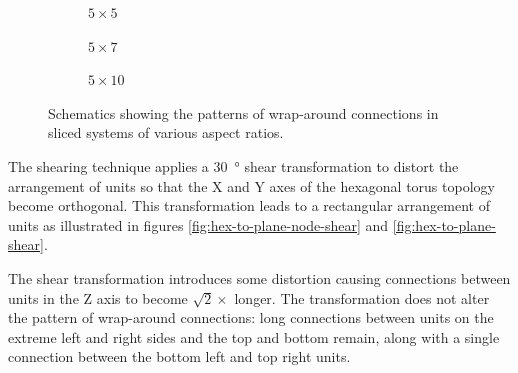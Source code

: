 \begin{figure}
				\caption[Rectangularisation of wrapped triple partitioned toruses.]%
				{Rectangularisation of wrapped triple partitioned hexagonal
				toruses. Thin lines show wrap-around links.  Flat-topped hexagons
				represent wrapped triple partitioned units.}
				\label{fig:hex-to-plane}
				
				
				
				\center
				\begin{subfigure}[b]{0.3\linewidth}
					\center
					\caption{$5\times5$}
				\end{subfigure}
				\begin{subfigure}[b]{0.3\linewidth}
					\center
					\caption{$5\times7$}
				\end{subfigure}
				\begin{subfigure}[b]{0.3\linewidth}
					\center
					\caption{$5\times10$}
				\end{subfigure}
				
				\caption[Patterns of wrap-around connections in sliced systems.]%
				{Schematics showing the patterns of wrap-around connections in sliced
				systems of various aspect ratios.}
				\label{fig:slicing-examples}
			\end{figure}
			
			The shearing technique applies a \SI{30}{\degree} shear transformation to
			distort the arrangement of units so that the X and Y axes of the
			hexagonal torus topology become orthogonal. This transformation leads to
			a rectangular arrangement of units as illustrated in figures
			\ref{fig:hex-to-plane-node-shear} and \ref{fig:hex-to-plane-shear}.
			
			The shear transformation introduces some distortion causing connections
			between units in the Z axis to become $\sqrt{2} \times$ longer. The
			transformation does not alter the pattern of wrap-around connections:
			long connections between units on the extreme left and right sides and
			the top and bottom remain, along with a single connection between the
			bottom left and top right units.
			
